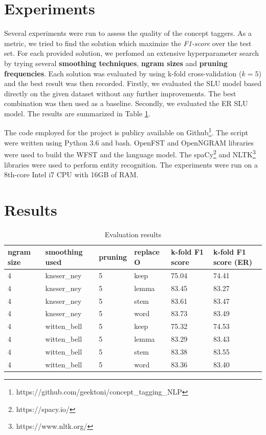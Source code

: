 \documentclass[11pt,a4paper]{article}
\begin{document}
\section{Experiments}

Several experiments were run to assess the quality of 
the concept taggers. As a metric, we tried to find the solution which maximize the \textit{F1-score} over the test set. For each provided solution, we perfomed an extensive hyperparameter search by trying several \textbf{smoothing techniques}, \textbf{ngram sizes} and \textbf{pruning frequencies}. Each solution was evaluated by using k-fold cross-validation ($k=5$) and the best result was then recorded. Firstly, we evaluated the SLU model based directly on the given dataset without any further improvements. The best combination was then used as a baseline. Secondly, we evaluated the ER SLU model. The results are summarized in Table \ref{tab:eval-resuts}.

The code employed for the project is publicy available on Github\footnote{https://github.com/geektoni/concept\_tagging\_NLP}. The script were written using Python 3.6 and bash. OpenFST \cite{openfst} and OpenNGRAM \cite{opengrm} libraries were used to build the WFST and the language model. The spaCy\footnote{https://spacy.io/} and NLTK\footnote{https://www.nltk.org/} libraries were used to perform entity recognition.
The experiments were run on a 8th-core Intel i7 CPU with 16GB of RAM. 

\section{Results}

\begin{table}[h!]
\centering
\caption{Evaluation results}
\label{tab:eval-resuts}
\begin{tabular}{llllll}
\hline
\textbf{ngram size} & \textbf{smoothing used} & \textbf{pruning} & \textbf{replace O} & \textbf{k-fold F1 score} & \textbf{k-fold F1 score (ER)} \\ \hline
4 & kneser\_ney & 5 & keep & 75.04 & 74.41 \\
4 & kneser\_ney & 5 & lemma & 83.45 & 83.27 \\
4 & kneser\_ney & 5 & stem & 83.61 & 83.47 \\
4 & kneser\_ney & 5 & word & 83.73 & 83.49 \\
4 & witten\_bell & 5 & keep & 75.32 & 74.53 \\
4 & witten\_bell & 5 & lemma & 83.29 & 83.43 \\
4 & witten\_bell & 5 & stem & 83.38 & 83.55 \\
4 & witten\_bell & 5 & word & 83.36 & 83.40 \\ \hline
\end{tabular}
\end{table}
\end{document}
